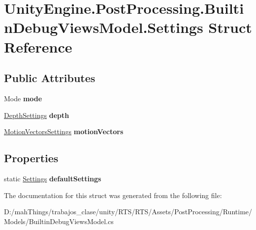 \hypertarget{struct_unity_engine_1_1_post_processing_1_1_builtin_debug_views_model_1_1_settings}{}\section{Unity\+Engine.\+Post\+Processing.\+Builtin\+Debug\+Views\+Model.\+Settings Struct Reference}
\label{struct_unity_engine_1_1_post_processing_1_1_builtin_debug_views_model_1_1_settings}
\subsection*{Public Attributes}
\begin{DoxyCompactItemize}
\item 
\mbox{\label{struct_unity_engine_1_1_post_processing_1_1_builtin_debug_views_model_1_1_settings_a64bfde9afcab454ff4cae8093cbfc961}} 
Mode {\bfseries mode}
\item 
\mbox{\label{struct_unity_engine_1_1_post_processing_1_1_builtin_debug_views_model_1_1_settings_a7283a05c8d37043a2643d573943f20b7}} 
\mbox{\hyperlink{struct_unity_engine_1_1_post_processing_1_1_builtin_debug_views_model_1_1_depth_settings}{Depth\+Settings}} {\bfseries depth}
\item 
\mbox{\label{struct_unity_engine_1_1_post_processing_1_1_builtin_debug_views_model_1_1_settings_ae87a46433175c77452522ba4c1bc855b}} 
\mbox{\hyperlink{struct_unity_engine_1_1_post_processing_1_1_builtin_debug_views_model_1_1_motion_vectors_settings}{Motion\+Vectors\+Settings}} {\bfseries motion\+Vectors}
\end{DoxyCompactItemize}
\subsection*{Properties}
\begin{DoxyCompactItemize}
\item 
\mbox{\label{struct_unity_engine_1_1_post_processing_1_1_builtin_debug_views_model_1_1_settings_a3f6924d1e6965becf46634057007e552}} 
static \mbox{\hyperlink{struct_unity_engine_1_1_post_processing_1_1_builtin_debug_views_model_1_1_settings}{Settings}} {\bfseries default\+Settings}
\end{DoxyCompactItemize}


The documentation for this struct was generated from the following file\+:\begin{DoxyCompactItemize}
\item 
D\+:/mah\+Things/trabajos\+\_\+clase/unity/\+R\+T\+S/\+R\+T\+S/\+Assets/\+Post\+Processing/\+Runtime/\+Models/Builtin\+Debug\+Views\+Model.\+cs\end{DoxyCompactItemize}
